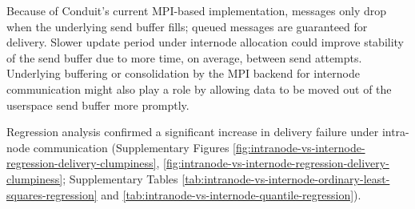 Because of Conduit's current MPI-based implementation, messages only drop when the underlying send buffer fills; queued messages are guaranteed for delivery.
Slower update period under internode allocation could improve stability of the send buffer due to more time, on average, between send attempts.
Underlying buffering or consolidation by the MPI backend for internode communication might also play a role by allowing data to be moved out of the userspace send buffer more promptly.

Regression analysis confirmed a significant increase in delivery failure under intra-node communication (Supplementary Figures \ref{fig:intranode-vs-internode-regression-delivery-clumpiness}, \ref{fig:intranode-vs-internode-regression-delivery-clumpiness}; Supplementary Tables \ref{tab:intranode-vs-internode-ordinary-least-squares-regression} and \ref{tab:intranode-vs-internode-quantile-regression}).
